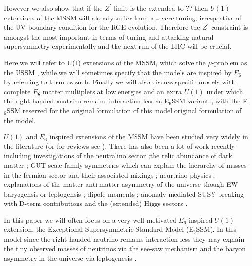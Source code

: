 \documentclass[preprint,amsmath,amssymb,aps,superscriptaddress,prd,showpacs,floatfix]{revtex4-1}
\begin{document}
However we also show that if the $Z^\prime$ limit is the extended to
?? then $U(1)$ extensions of the MSSM will already suffer from a
severe tuning, irrespective of the UV boundary condition for the RGE
evolution.  Therefore the $Z^\prime$ constraint is amongst the most
important in terms of tuning and attacking natural supersymmetry
experimentally and the next run of the LHC will be crucial.



Here we will refer to U(1) extensions of the MSSM, which solve the
$\mu$-problem as the USSM
\cite{Cvetic:1995rj, Jain:1995cb, Nir:1995bu, Cvetic:1996mf, Cvetic:1997ky}, while we will
sometimes specify that the models are inspired by $E_6$ by referring
to them as such. Finally we will also discuss specific models with
complete $E_6$ matter multiplets at low energies and an extra $U(1)$
under which the right handed neutrino remains interaction-less as
E$_6$SSM-variants\cite{Howl:2007zi, Braam:2009fi, Braam:2010sy, Hall:2011zq, Nevzorov:2012hs, Athron:2014pua}, with the E$_6$SSM reserved for the original
formulation of this model \cite{King:2005jy,King:2005my,Athron:2010zz}
original formulation of the model.
 
$U(1)$ and $E_6$ inspired extensions of the MSSM have been studied
very widely in the literature \cite{Gunion:1989we, Gunion:1992hs,
  Binetruy:1985xm, Ellis:1986yg, Ibanez:1986si, Gunion:1986ky,
  Haber:1986gz, Baer:1987eb, Gunion:1987jd, Grifols:1986vr,
  Ellis:1986ip, Morris:1987fm, Drees:1987tp, Ma:1995xk,
  Suematsu:1997tv, Suematsu:1997qt, Suematsu:1997au, Keith:1996fv,
  Keith:1997zb, Gherghetta:1996yr, Demir:1998dk, Langacker:1998tc,
  Hambye:2000bn, Ma:2000jf} (or for reviews see
\cite{Hewett:1988xc,Langacker:2008yv}).  There has also been a lot of
work recently including investigations of the neutralino sector
\cite{Hesselbach:2001ri, Barger:2005hb, Choi:2006fz,
  Barger:2007nv};the relic abundance of dark matter
\cite{Kalinowski:2008iq}; GUT scale family symmetries which can
explain the hierarchy of masses in the fermion sector and their
associated mixings \cite{Stech:2008wd}; neurtrino physics
\cite{Kang:2004ix}; explanations of the matter-anti-matter asymmetry
of the universe though EW baryogensis or leptogensis
\cite{Hambye:2000bn,Ma:2000jf,Kang:2004pp}; dipole moments
\cite{GutierrezRodriguez:2006hb}; anomaly mediated SUSY breaking with
D-term contributions \cite{Asano:2008ju} and the (extended) Higgs
sectors \cite{Daikoku:2000ep,Ham:2008xf}.


In this paper we will often focus on a very well motivated $E_6$
inspired $U(1)$ extension, the Exceptional Supersymmetric Standard
Model (E$_6$SSM)\cite{King:2005jy,King:2005my,Athron:2010zz}.  In this
model since the right handed neutrino remains interaction-less they may
explain the tiny observed masses of neutrinos via the see-saw
mechanism and the baryon asymmetry in the universe via leptogenesis
\cite{Hambye:2000bn,King:2008qb, King:2008gw}.
\end{document}
